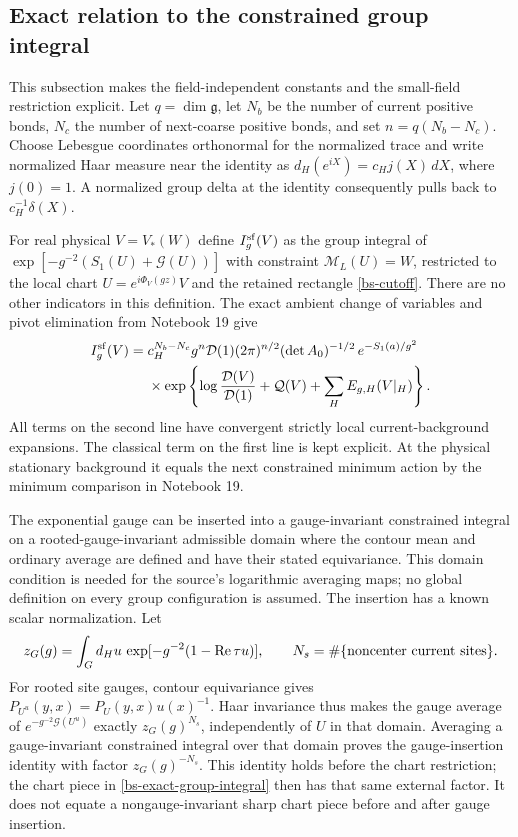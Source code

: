 \subsection{Exact relation to the constrained group integral}

This subsection makes the field-independent constants and the
small-field restriction explicit. Let $q=\dim\mathfrak g$,
let $N_b$ be the number of current positive bonds, $N_c$ the
number of next-coarse positive bonds, and set
$n=q(N_b-N_c)$. Choose Lebesgue coordinates orthonormal for
the normalized trace and write normalized Haar measure near
the identity as
$d_H(e^{iX})=c_H j(X)\,dX$, where $j(0)=1$.
A normalized group delta at the identity consequently pulls
back to $c_H^{-1}\delta(X)$.

For real physical $V=V_*(W)$ define $I_g^{\rm sf}(V)$ as
the group integral of
$\exp[-g^{-2}(S_1(U)+\mathcal G(U))]$
with constraint $\mathcal M_L(U)=W$, restricted to the local
chart $U=e^{i\Phi_V(gz)}V$ and the retained rectangle
\eqref{bs-cutoff}. There are no other indicators in this
definition. The exact ambient change of variables and pivot
elimination from Notebook 19 give
\begin{equation}\label{bs-exact-group-integral}
 \begin{split}
 I_g^{\rm sf}(V)={}&
 c_H^{N_b-N_c}g^n\mathcal D(1)
       (2\pi)^{n/2}(\det A_0)^{-1/2}\,
       e^{-S_1(a)/g^2}\\
 &\times\exp\left\{
 \log\frac{\mathcal D(V)}{\mathcal D(1)}
               +\mathcal Q(V)+\sum_HE_{g,H}(V|_H)\right\}.
 \end{split}
\end{equation}
All terms on the second line have convergent strictly local
current-background expansions. The classical term on the
first line is kept explicit. At the physical stationary
background it equals the next constrained minimum action by
the minimum comparison in Notebook 19.

The exponential gauge can be inserted into a gauge-invariant
constrained integral on a rooted-gauge-invariant admissible
domain where the contour mean and ordinary average are defined
and have their stated equivariance. This domain condition is
needed for the source's logarithmic averaging maps; no global
definition on every group configuration is assumed. The
insertion has a known scalar normalization. Let
\begin{equation}\label{bs-gauge-normalization}
 z_G(g)=\int_G d_Hu\,
       \exp[-g^{-2}(1-\operatorname{Re}\tau u)],
 \qquad N_s=\#\{\hbox{noncenter current sites}\}.
\end{equation}
For rooted site gauges, contour equivariance gives
$P_{U^u}(y,x)=P_U(y,x)u(x)^{-1}$.
Haar invariance thus makes the gauge average of
$e^{-g^{-2}\mathcal G(U^u)}$ exactly $z_G(g)^{N_s}$,
independently of $U$ in that domain. Averaging a
gauge-invariant constrained integral over that domain proves
the gauge-insertion identity with factor
$z_G(g)^{-N_s}$. This identity holds before the chart
restriction; the chart piece in
\eqref{bs-exact-group-integral} then has that same external
factor. It does not equate a nongauge-invariant sharp chart
piece before and after gauge insertion.

